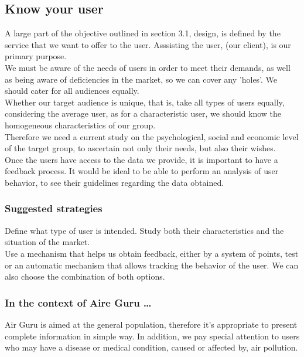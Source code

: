\subsection{Know your user}

A large part of the objective outlined in section 3.1, design, is defined by the service that we want to offer
to the user. Asssisting the user, (our client), is our primary purpose. \\

We must be aware of the needs of users in order to meet their demands, as well as being aware of deficiencies in the market, so we can cover any 'holes'.
We should cater for all audiences equally.\\

Whether our target audience is unique, that is, take all types of users equally, considering the
average user, as for a characteristic user, we should know the homogeneous characteristics of our group.\\

Therefore we need a current study on the psychological, social and economic level of the target group, to ascertain not only
their needs, but also their wishes.\\

Once the users have access to the data we provide, it is important to have a feedback process.
It would be ideal to be able to perform an analysis of user behavior, to see their guidelines regarding the data obtained.

\subsubsection*{Suggested strategies} 

Define what type of user is intended. Study both their characteristics and the situation of the
market.\\

Use a mechanism that helps us obtain feedback, either by a system of points, test or
an automatic mechanism that allows tracking the behavior of the user. We can also choose the combination of both
options.

\subsubsection*{In the context of Aire Guru \ldots}

Air Guru is aimed at the general population, therefore it's appropriate to present complete information in simple way. In addition, we pay special attention to users who may have a
disease or medical condition, caused or affected by, air pollution.\\

